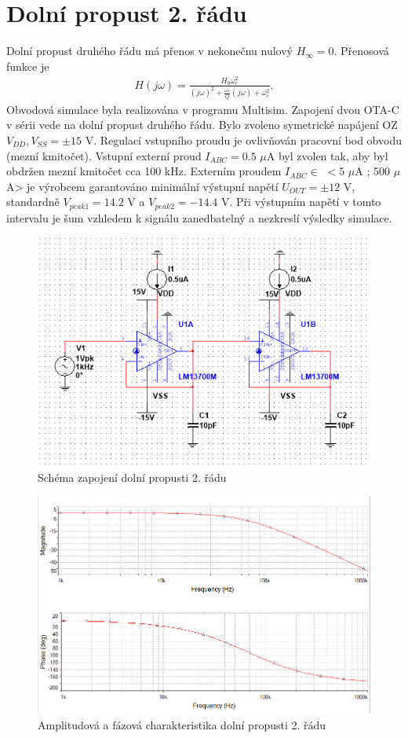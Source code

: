 \documentclass[twoside]{article}
\begin{document}
\section{Dolní propust 2. řádu}
Dolní propust druhého řádu má přenos v nekonečnu nulový $H_{\infty} = 0$. Přenosová funkce je
\begin{align}
H(j\omega) = \frac{H_0 \omega_c ^2}{(j\omega)^2 + \frac{\omega _c}{Q}(j\omega) + \omega _c ^2}.
\end{align}
Obvodová simulace byla realizována v programu Multisim. Zapojení dvou OTA-C v sérii vede na dolní propust druhého řádu. Bylo zvoleno symetrické napájení OZ $V_{DD},V_{SS} = \pm 15$ V. Regulací vstupního proudu je ovlivňován pracovní bod obvodu (mezní kmitočet). Vstupní externí proud $I_{ABC} = 0.5$ $\mu$A byl zvolen tak, aby byl obdržen mezní kmitočet cca 100 kHz. Externím proudem $I_{ABC} \in$ $<5$ $\mu$A ; 500 $\mu$A> je výrobcem garantováno minimální výstupní napětí $U_{OUT} = \pm 12$ V, standardně $V_{peak 1} = 14.2$ V a $V_{peak 2} = -14.4$ V. Při výstupním napětí v tomto intervalu je šum vzhledem k signálu zanedbatelný a nezkreslí výsledky simulace.\\
\begin{figure}[H]
\centering
\includegraphics[scale=0.75]{1503.png}
\caption{Schéma zapojení dolní propusti 2. řádu}
\end{figure}
\begin{figure}[H]
\centering
\includegraphics[scale=0.75]{15032.png}
\caption{Amplitudová a fázová charakteristika dolní propusti 2. řádu}
\end{figure}
\end{document}
